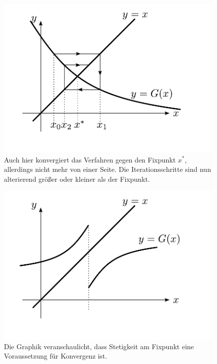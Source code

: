 \documentclass[10pt,a4paper]{article}
\begin{document}
\begin{figure}[H]
\includegraphics[width=\textwidth]{images/nicht_monotone_konvergenz}
\caption{Auch hier konvergiert das Verfahren gegen den Fixpunkt $x^{*}$, allerdings nicht mehr von einer Seite. Die Iterationsschritte sind nun alterierend größer oder kleiner als der Fixpunkt.}
\end{figure}

\begin{figure}[H]
\includegraphics[width=\textwidth]{images/stetigkeit_fuer_fixpunkt}
\caption{Die Graphik veranschaulicht, dass Stetigkeit am Fixpunkt eine Voraussetzung für Konvergenz ist.}
\end{figure}
\end{document}
